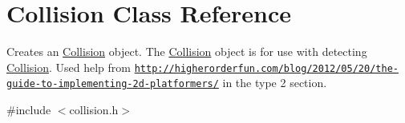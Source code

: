 \hypertarget{class_collision}{\section{Collision Class Reference}
\label{class_collision}
}


Creates an \hyperlink{class_collision}{Collision} object. The \hyperlink{class_collision}{Collision} object is for use with detecting \hyperlink{class_collision}{Collision}. Used help from \href{http://higherorderfun.com/blog/2012/05/20/the-guide-to-implementing-2d-platformers/}{\tt http\+://higherorderfun.\+com/blog/2012/05/20/the-\/guide-\/to-\/implementing-\/2d-\/platformers/} in the type 2 section.  




{\ttfamily \#include $<$collision.\+h$>$}

